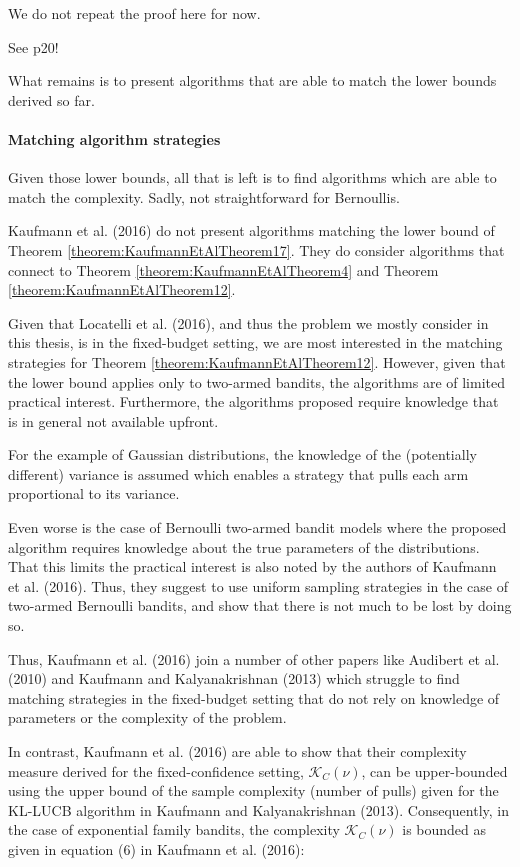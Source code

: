 \documentclass[12pt,]{article}
\let\oldparagraph\paragraph
\renewcommand{\paragraph}[1]{\oldparagraph{#1}\mbox{}}
\begin{document}
We do not repeat the proof here for now.

See p20!

What remains is to present algorithms that are able to match the lower
bounds derived so far.

\paragraph{Matching algorithm
strategies}\label{matching-algorithm-strategies}

Given those lower bounds, all that is left is to find algorithms which
are able to match the complexity. Sadly, not straightforward for
Bernoullis.

Kaufmann et al. (2016) do not present algorithms matching the lower
bound of Theorem \ref{theorem:KaufmannEtAlTheorem17}. They do consider
algorithms that connect to Theorem \ref{theorem:KaufmannEtAlTheorem4}
and Theorem \ref{theorem:KaufmannEtAlTheorem12}.

Given that Locatelli et al. (2016), and thus the problem we mostly
consider in this thesis, is in the fixed-budget setting, we are most
interested in the matching strategies for Theorem
\ref{theorem:KaufmannEtAlTheorem12}. However, given that the lower bound
applies only to two-armed bandits, the algorithms are of limited
practical interest. Furthermore, the algorithms proposed require
knowledge that is in general not available upfront.

For the example of Gaussian distributions, the knowledge of the
(potentially different) variance is assumed which enables a strategy
that pulls each arm proportional to its variance.

Even worse is the case of Bernoulli two-armed bandit models where the
proposed algorithm requires knowledge about the true parameters of the
distributions. That this limits the practical interest is also noted by
the authors of Kaufmann et al. (2016). Thus, they suggest to use uniform
sampling strategies in the case of two-armed Bernoulli bandits, and show
that there is not much to be lost by doing so.

Thus, Kaufmann et al. (2016) join a number of other papers like Audibert
et al. (2010) and Kaufmann and Kalyanakrishnan (2013) which struggle to
find matching strategies in the fixed-budget setting that do not rely on
knowledge of parameters or the complexity of the problem.

In contrast, Kaufmann et al. (2016) are able to show that their
complexity measure derived for the fixed-confidence setting,
\(\mathcal{K}_C(\nu)\), can be upper-bounded using the upper bound of
the sample complexity (number of pulls) given for the KL-LUCB algorithm
in Kaufmann and Kalyanakrishnan (2013). Consequently, in the case of
exponential family bandits, the complexity \(\mathcal{K}_C(\nu)\) is
bounded as given in equation (6) in Kaufmann et al. (2016):
\end{document}
